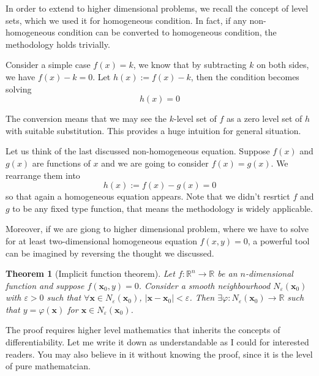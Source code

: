 \documentclass[12pt]{article}
\newtheorem*{theorem}{Theorem}
\begin{document}
    In order to extend to higher dimensional problems, we recall the concept of level sets, which we used it for homogeneous condition. In fact, if any non-homogeneous condition can be converted to homogeneous condition, the methodology holds trivially.

    Consider a simple case $f(x)=k$, we know that by subtracting $k$ on both sides, we have $f(x)-k=0$. Let $h(x):=f(x)-k$, then the condition becomes solving \[h(x)=0\]

    The conversion means that we may see the $k$-level set of $f$ as a zero level set of $h$ with suitable substitution. This provides a huge intuition for general situation.

    Let us think of the last discussed non-homogeneous equation. Suppose $f(x)$ and $g(x)$ are functions of $x$ and we are going to consider $f(x)=g(x)$. We rearrange them into \[h(x):=f(x)-g(x)=0\] so that again a homogeneous equation appears. Note that we didn't resrtict $f$ and $g$ to be any fixed type function, that means the methodology is widely applicable.

    Moreover, if we are giong to higher dimensional problem, where we have to solve for at least two-dimensional homogeneous equation $f(x,y)=0$, a powerful tool can be imagined by reversing the thought we discussed.
    
    \begin{theorem}[Implicit function theorem]
        Let $f:\mathbb{R}^n\to\mathbb{R}$ be an $n$-dimensional function and suppose $f(\mathbf{x}_0,y)=0$. Consider a smooth neighbourhood $N_{\varepsilon}(\mathbf{x}_0)$ with $\varepsilon>0$ such that $\forall \mathbf{x} \in N_{\varepsilon}(\mathbf{x}_0)$, $|\mathbf{x}-\mathbf{x}_0|<\varepsilon$. Then $\exists \varphi:N_{\varepsilon}(\mathbf{x}_0)\to\mathbb{R}$ such that $y=\varphi(\mathbf{x})$ for $\mathbf{x}\in N_{\varepsilon}(\mathbf{x}_0)$.
    \end{theorem}

    The proof requires higher level mathematics that inherits the concepts of differentiability. Let me write it down as understandable as I could for interested readers. You may also believe in it without knowing the proof, since it is the level of pure mathematcian.
\end{document}
